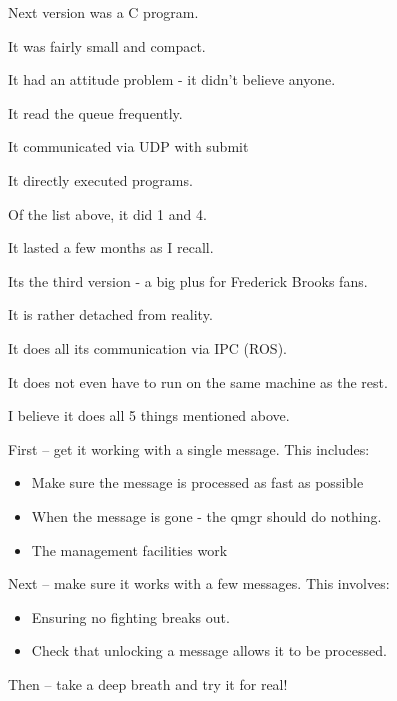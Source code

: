 \begin{bwslide}
\begin{nrtc}
\item	Next version was a C program.
\item	It was fairly small and compact.
\item	It had an attitude problem - it didn't believe anyone.
\item	It read the queue frequently.
\item	It communicated via UDP with submit
\item	It directly executed programs.
\item	Of the list above, it did 1 and 4.
\item	It lasted a few months as I recall.
\end{nrtc}
\end{bwslide}

\begin{bwslide}
\begin{nrtc}
\item	Its the third version - a big plus for Frederick Brooks fans.
\item	It is rather detached from reality.
\item	It does all its communication via IPC (ROS).
\item	It does not even have to run on the same machine as the rest.
\item	I believe it does all 5 things mentioned above.
\end{nrtc}
\end{bwslide}

\begin{bwslide}
\begin{nrtc}
\item	First -- get it working with a single message. This includes:
	\begin{itemize}
	\item	Make sure the message is processed as fast as possible
	\item	When the message is gone - the qmgr should do nothing.
	\item The management facilities work
	\end{itemize}
\item	Next -- make sure it works with a few messages. This involves:
	\begin{itemize}
	\item	Ensuring no fighting breaks out.
	\item	Check that unlocking a message allows it to be processed.
	\end{itemize}
\item	Then -- take a deep breath and try it for real!
\end{nrtc}
\end{bwslide}

